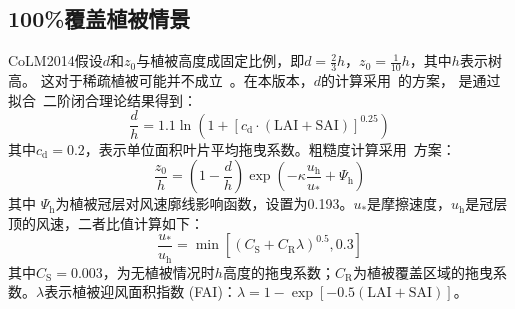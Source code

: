 \subsection{100\%覆盖植被情景}\label{百分百植被覆盖湍流}
CoLM2014假设$d$和$z_0$与植被高度成固定比例，即$d=\frac{2}{3}h$，$z_0=\frac{1}{10}h$，其中$h$表示树高。
这对于稀疏植被可能并不成立~\citep{zeng2007consistent}。在本版本，$d$的计算采用~\citet{choudhury1988}的方案，
是通过拟合~\citet{shaw1982aerodynamic}二阶闭合理论结果得到：
\begin{equation}\label{dOh}
  \frac{d}{h}=1.1 \ln \left (1+\left[c_{\mathrm{d}} \cdot (\text {LAI} + \text {SAI})\right]^{0.25} \right)
\end{equation}
其中$c_{\mathrm {d}}=0.2$，表示单位面积叶片平均拖曳系数。粗糙度计算采用~\citet{raupach1992drag,raupach1994simplified}方案：
\begin{equation}\label{zOh}
  \frac{z_{0}}{h}=\left(1-\frac{d}{h}\right) \exp \left(-\kappa \frac{u_{\mathrm{h}}}{u_{*}}+\Psi_{\mathrm{h}}\right)
\end{equation}
其中%
$\Psi_{\mathrm h}$为植被冠层对风速廓线影响函数，设置为0.193。$u_\ast$是摩擦速度，$u_{\mathrm h}$是冠层顶的风速，二者比值计算如下：
\begin{equation}\label{ustrarOuh}
  \frac{u_{*}}{u_{\mathrm{h}}}=\min \left[\left(C_{\mathrm{S}}+C_{\mathrm{R}} \lambda\right)^{0.5}, 0.3\right]
\end{equation}
其中$C_{\mathrm {S}}=0.003$，为无植被情况时$h$高度的拖曳系数；$C_{\mathrm {R}}$为植被覆盖区域的拖曳系数。$\lambda$表示植被迎风面积指数 (FAI)：$\lambda=1-\exp{\left[-0.5 (\text {LAI}+\text {SAI})\right]}$。



